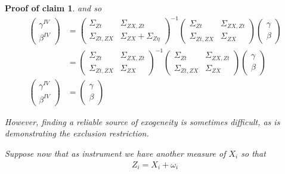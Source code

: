 \documentclass[10pt]{article}
\newtheorem{claimproof}{Proof of claim}[claim]
\begin{document}
\begin{claimproof}
        and so
        \begin{align}
            \left(\begin{array}{l}
        {\gamma}^{IV} \\
        {\beta}^{IV}
        \end{array}\right)
        & =\left(\begin{array}{cc}
        {\Sigma}_{Zt} & \Sigma_{ZX,Zt} \\
        \Sigma_{Zt,ZX}& {\Sigma}_{ZX}+{\Sigma}_{Z\eta}
        \end{array}\right)^{-1}\left(\begin{array}{cc}
        {\Sigma}_{Zt} & \Sigma_{ZX,Zt} \\
        \Sigma_{Zt,ZX} & {\Sigma}_{ZX}
        \end{array}\right)\left(\begin{array}{l}
        {\gamma} \\
        {\beta}
        \end{array}\right)\\
        & =\left(\begin{array}{cc}
        {\Sigma}_{Zt} & \Sigma_{ZX,Zt} \\
        \Sigma_{Zt,ZX}& {\Sigma}_{ZX}
        \end{array}\right)^{-1}\left(\begin{array}{cc}
        {\Sigma}_{Zt} & \Sigma_{ZX,Zt} \\
        \Sigma_{Zt,ZX} & {\Sigma}_{ZX}
        \end{array}\right)\left(\begin{array}{l}
        {\gamma} \\
        {\beta}
        \end{array}\right) \\
        \left(\begin{array}{l}
        {\gamma}^{IV} \\
        {\beta}^{IV}
        \end{array}\right)
        & =\left(\begin{array}{l}
        {\gamma} \\
        {\beta}
        \end{array}\right)
        \end{align}
        
        However, finding a reliable source of exogeneity is sometimes difficult, as is demonstrating the exclusion restriction.
        
        Suppose now that as instrument we have another measure of $X_i$ so that
        \begin{align}
            Z_i=X_i+\omega_i
        \end{align}
        

\end{claimproof}
\end{document}
